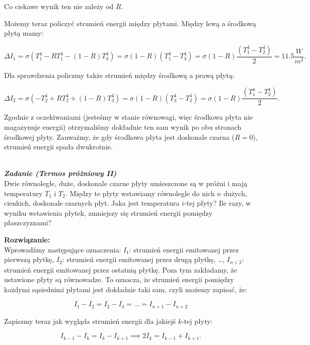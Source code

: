 \documentclass[11pt,a4paper]{article}
\newcounter{zadanie}\newcommand{\zadanie}[1][]{\addtocounter{zadanie}{1} ~\\  {\bf \emph{Zadanie \arabic{zadanie} #1 }} \\}
\begin{document}
Co ciekawe wynik ten nie zależy od $R$.

Możemy teraz policzyć strumień energii między płytami. Między lewą a środkową płytą mamy:

\begin{equation}
  \Delta I_1 = \sigma (  T_1^4- R T_1^4 - (1-R)T_3^4) = \sigma (1-R) (T_1^4-T_3^4) =
  \sigma(1-R) \frac{(T_1^4-T_2^4)}{2} = 11.5 \frac{W}{m^2}.
\end{equation}

Dla sprawdzenia policzmy także strumień między środkową a prawą płytą:

\begin{equation}
  \Delta I_2 = \sigma (  -T_2^4 + R T_2^4 + (1-R)T_3^4) =
  \sigma (1-R) (T_3^4-T_2^4) = \sigma(1-R) \frac{(T_1^4-T_2^4)}{2}.
\end{equation}

Zgodnie z oczekiwaniami (jesteśmy w stanie równowagi, więc środkowa płyta nie magazynuje energii)
otrzymaliśmy dokładnie ten sam wynik po obu stronach środkowej płyty. Zauważmy, że gdy środkowa płyta
jest doskonale czarna ($R=0$), strumień energii spada dwukrotnie.

\newpage
\zadanie [(Termos próżniowy II)]
Dwie równoległe, duże, doskonale czarne płyty umieszczone są w próżni i mają temperatury $T_1$ i $T_2$.
Między te płyty wstawiamy równolegle do nich $n$ dużych, cienkich, doskonale czarnych płyt.
Jaka jest temperatura $i$-tej płyty? 
Ile razy, w wyniku wstawienia płytek, zmniejszy się strumień energii pomiędzy płaszczyznami? 

\vskip 10pt
\textbf{Rozwiązanie:}\\

Wprowadźmy następujące oznaczenia: $I_1$: strumień energii emitowanej przez pierwszą płytkę, $I_2$: strumień energii emitowanej przez drugą płytkę, \ldots, $I_{n+2}$: strumień energii emitowanej przez ostatnią płytkę. Poza tym zakładamy, że ustawione płyty są równowadze. To oznacza, że strumień energii pomiędzy każdymi sąsiednimi płytami jest dokładnie taki sam, czyli możemy zapisać, że:

\begin{equation}
I_{1}-I_{2} = I_{2}-I_{3} = \ldots = I_{n+1} - I_{n+2}
\end{equation}

Zapiszmy teraz jak wygląda strumień energii dla jakiejś $k$-tej płyty:

\begin{equation}
I_{k-1} - I_{k} = I_{k} - I_{k+1} \implies 2I_{k} = I_{k-1}+I_{k+1}.
\end{equation}
\end{document}
